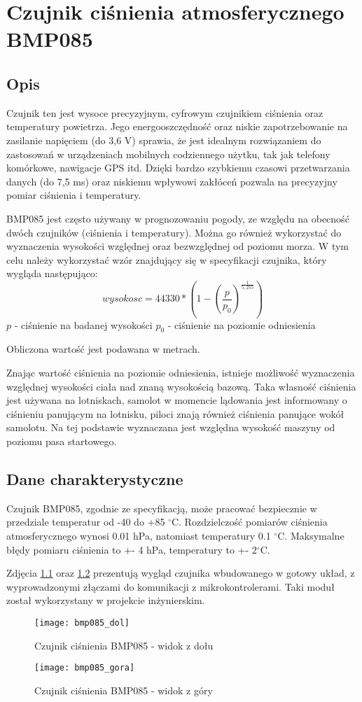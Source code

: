 \chapter{Czujnik ciśnienia atmosferycznego BMP085}
\section*{Opis}
Czujnik ten jest wysoce precyzyjnym, cyfrowym czujnikiem ciśnienia oraz temperatury powietrza. Jego energooszczędność oraz niskie zapotrzebowanie na zasilanie napięciem (do 3,6 V) sprawia, że jest idealnym rozwiązaniem do zastosowań w urządzeniach mobilnych codziennego użytku, tak jak telefony komórkowe, nawigacje GPS itd. Dzięki bardzo szybkiemu czasowi      przetwarzania danych (do 7,5 ms) oraz niskiemu wpływowi zakłóceń pozwala na precyzyjny pomiar ciśnienia i temperatury.


BMP085 jest często używany w prognozowaniu pogody, ze względu na obecność dwóch czujników (ciśnienia i temperatury). Można go również wykorzystać do wyznaczenia wysokości względnej oraz bezwzględnej od poziomu morza. W tym celu należy wykorzystać wzór znajdujący się w specyfikacji czujnika, który wygląda następująco:
$$ wysokosc = 44330 * (1- (\frac{p}{p_{0}})^{\frac{1}{5,255}})$$
$ p $ - ciśnienie na badanej wysokości\newline
$ p_{0} $ - ciśnienie na poziomie odniesienia
\newline

Obliczona wartość jest podawana w metrach.

Znając wartość ciśnienia na poziomie odniesienia, istnieje możliwość wyznaczenia względnej wysokości ciała nad znaną wysokością bazową. Taka własność ciśnienia jest używana na lotniskach, samolot w momencie lądowania jest informowany o ciśnieniu panującym na lotnisku, piloci znają również ciśnienia panujące wokół samolotu. Na tej podstawie wyznaczana jest względna wysokość maszyny od poziomu pasa startowego.

\section*{Dane charakterystyczne}
Czujnik BMP085, zgodnie ze specyfikacją, może pracować bezpiecznie w przedziale temperatur od -40 do +85 $^\circ$C. Rozdzielczość pomiarów ciśnienia atmosferycznego wynosi 0.01 hPa, natomiast temperatury 0.1 $^\circ$C. Maksymalne błędy pomiaru ciśnienia to +- 4 hPa, temperatury to +- 2$^\circ$C.

Zdjęcia \ref{fig:bmp085_dol} oraz \ref{fig:bmp085_gora} prezentują wygląd czujnika wbudowanego w gotowy układ, z wyprowadzonymi złączami do komunikacji z mikrokontrolerami. Taki moduł został wykorzystany w projekcie inżynierskim.
\begin{figure}[h]
\centering
\texttt{[image: bmp085\_dol]}
\caption{Czujnik ciśnienia BMP085 - widok z dołu}
\label{fig:bmp085_dol}
\end{figure}
\begin{figure}[h]
\centering
\texttt{[image: bmp085\_gora]}
\caption{Czujnik ciśnienia BMP085 - widok z góry}
\label{fig:bmp085_gora}
\end{figure}

